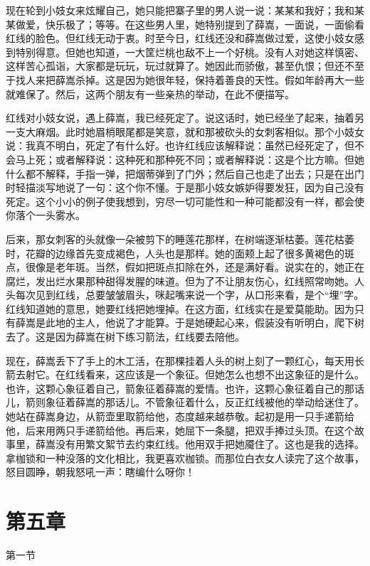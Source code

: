 现在轮到小妓女来炫耀自己，她只能把寨子里的男人说一说：某某和我好；我和某某做爱，快乐极了；等等。在这些男人里，她特别提到了薛嵩，一面说，一面偷看红线的脸色。但红线无动于衷。时至今日，红线还没和薛嵩做过爱，这使小妓女感到特别得意。但她也知道，一大筐烂桃也敌不上一个好桃。没有人对她这样慎密、这样苦心孤诣，大家都是玩玩，玩过就算了。她因此而骄傲，甚至仇恨；但还不至于找人来把薛嵩杀掉。这是因为她很年轻，保持着善良的天性。假如年龄再大一些就难保了。然后，这两个朋友有一些亲热的举动，在此不便描写。 

红线对小妓女说，遇上薛嵩，我已经死定了。说这话时，她已经坐了起来，抽着另一支大麻烟。此时她眉梢眼尾都是笑意，就和那被砍头的女刺客相似。那个小妓女说：我真不明白，死定了有什么好。也许红线应该解释说：虽然已经死定了，但不会马上死；或者解释说：这种死和那种死不同；或者解释说：这是个比方嘛。但她什么都不解释，手指一弹，把烟蒂弹到了门外；然后自己也走了出去；只是在出门时轻描淡写地说了一句：这个你不懂。于是那小妓女嫉妒得要发狂，因为自己没有死定。这个小小的例子使我想到，穷尽一切可能性和一种可能都没有一样，都会使你落个一头雾水。 

后来，那女刺客的头就像一朵被剪下的睡莲花那样，在树端逐渐枯萎。莲花枯萎时，花瓣的边缘首先变成褐色，人头也是那样。她的面颊上起了很多黄褐色的斑点，很像是老年斑。当然，假如把斑点扣除在外，还是满好看。说实在的，她正在腐烂，发出烂水果那种甜得发腥的味道。但为了不让朋友伤心，红线照常吻她。人头每次见到红线，总要皱皱眉头，咪起嘴来说一个字，从口形来看，是个“埋”字。红线知道她的意思，她要红线把她埋掉。在这方面，红线实在是爱莫能助。因为只有薛嵩是此地的主人，他说了才能算。于是她硬起心来，假装没有听明白，爬下树去了。这是因为薛嵩在树下练习箭法，红线要去陪他。 

现在，薛嵩丢下了手上的木工活，在那棵挂着人头的树上刻了一颗红心，每天用长箭去射它。在红线看来，这应该是一个象征。但她怎么也想不出这象征的是什么。也许，这颗心象征着自己，箭象征着薛嵩的爱情。也许，这颗心象征着自己的那话儿，箭则象征着薛嵩的那话儿。不管象征着什么，反正红线被他的举动给迷住了。她站在薛嵩身边，从箭壶里取箭给他，态度越来越恭敬。起初是用一只手递箭给他，后来用两只手递箭给他。再后来，她屈下一条腿，把双手捧过头顶。在这个故事里，薛嵩没有用繁文絮节去约束红线。他用双手把她魇住了。这也是我的选择。拿枷锁和一种没落的文化相比，我更喜欢枷锁。而那位白衣女人读完了这个故事，怒目圆睁，朝我怒吼一声：瞎编什么呀你！

\section{第五章}

第一节 

